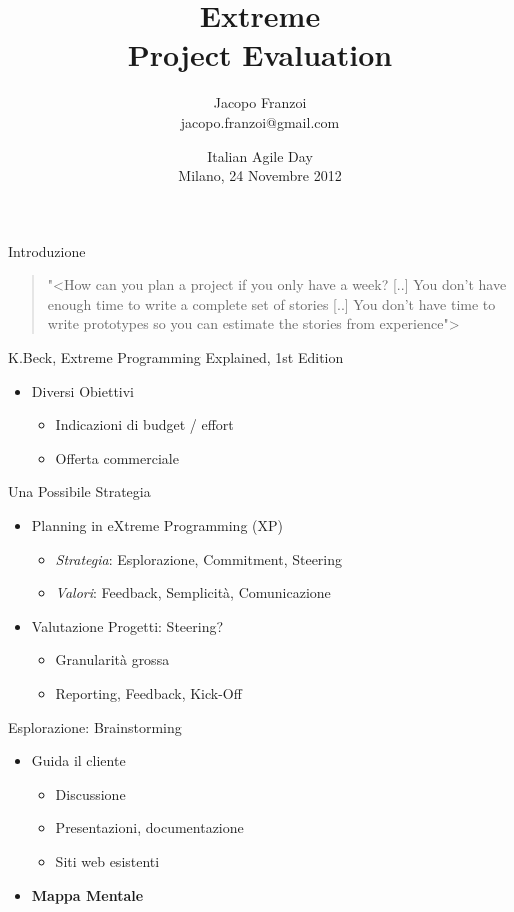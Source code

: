 \documentclass[compress, red, 14pt]{beamer}
\title{ Extreme \\ Project Evaluation }
\author{
	Jacopo Franzoi \\
	{\scriptsize jacopo.franzoi@gmail.com }
}
\date{
	Italian Agile Day \\
	Milano, 24 Novembre 2012
}
\newcommand{\highlight}[1]{{\color{purple} \emph{#1}}}
\begin{document}
	\begin{frame}
		\titlepage
	\end{frame}

	\begin{frame}{Introduzione}
		\begin{quote}
			{\small "<{How can you plan a project if you only have a week? [..] You don't have enough time to write a complete set of stories [..] You don't have time to write prototypes so you can estimate the stories from experience}">}
		\end{quote}
		\hfill {\scriptsize K.Beck, Extreme Programming Explained, 1st Edition}

		\begin{itemize}
			\item Diversi Obiettivi
			\begin{itemize}
				\item Indicazioni di budget / effort
				\item Offerta commerciale
			\end{itemize}
		\end{itemize}
	\end{frame}


	\begin{frame}{Una Possibile Strategia}
		\begin{itemize}
			\item Planning in eXtreme Programming (XP)
			\begin{itemize}
				\item \highlight{Strategia}: Esplorazione, Commitment, Steering
				\item \highlight{Valori}: Feedback, Semplicità, Comunicazione
			\end{itemize}

			\item Valutazione Progetti: Steering?
			\begin{itemize}
				\item Granularità grossa
				\item Reporting, Feedback, Kick-Off
			\end{itemize}

		\end{itemize}
	\end{frame}


	\begin{frame}{Esplorazione: Brainstorming}
		\begin{itemize}
			\item Guida il cliente
			\begin{itemize}
				\item Discussione
				\item Presentazioni, documentazione
				\item Siti web esistenti
			\end{itemize}
		\end{itemize}	

		\begin{itemize}
			\item \textbf{Mappa Mentale}
		\end{itemize}

	\end{frame}
\end{document}
